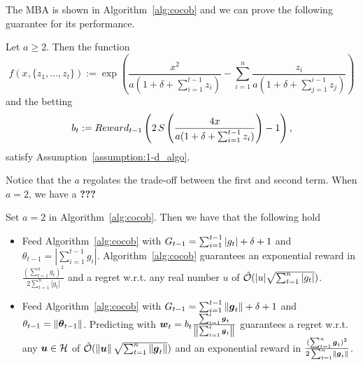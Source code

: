 The \ac{MBA} is shown in Algorithm~\ref{alg:cocob} and we can prove the following guarantee for its performance.
%
\begin{theorem}
\label{theo:cocob}
Let $a\geq2$. Then the function 
\[
f(x,\{z_1, \ldots, z_t\}) := \exp\left(\frac{x^2}{a (1+\delta+\sum_{i=1}^{t-1} z_i)} - \sum_{i=1}^{n} \frac{z_i}{a( 1+\delta+\sum_{j=1}^{i-1} z_j) } \right)
\]
and the betting 
\[
b_t:= Reward_{t-1} \left(2 \, S\left(\frac{4 x}{a (1+\delta+\sum_{i=1}^{t-1} z_i)}\right)-1\right),
\]
satisfy Assumption~\ref{assumption:1-d_algo}.
% 
\end{theorem}
%
Notice that the $a$ regolates the trade-off between the first and second term. When $a=2$, we have a \textbf{???}

\begin{cor}
Set $a=2$ in Algorithm~\ref{alg:cocob}. Then we have that the following hold

\begin{itemize}
\item Feed Algorithm~\ref{alg:cocob} with $G_{t-1}=\sum_{i=1}^{t-1} |g_t| + \delta + 1$ and $\theta_{t-1}=|\sum_{i=1}^{t-1} g_i|$.
Algorithm~\ref{alg:cocob} guarantees an exponential reward in $\frac{(\sum_{t=1}^n g_t)^2}{2 \sum_{t=1}^n |g_t|}$ and a regret w.r.t. any real number $u$ of $\tilde{\mathcal{O}}(|u| \sqrt{\sum_{t=1}^n |g_t|})$.

\item Feed Algorithm~\ref{alg:cocob} with $G_{t-1}=\sum_{i=1}^{t-1} \left\|{\boldsymbol{g}_t}\right\| + \delta + 1$ and $\theta_{t-1}=\left\|{{\boldsymbol{\theta}}_{t-1}}\right\|$.
Predicting with $\boldsymbol{w}_t=b_t \frac{\sum_{i=1}^t \boldsymbol{g}_t}{\left\|{\sum_{i=1}^t \boldsymbol{g}_t}\right\|}$ guarantees a regret w.r.t. any $\boldsymbol{u} \in \mathcal{H}$ of $\tilde{\mathcal{O}}(\left\|{\boldsymbol{u}}\right\| \sqrt{\sum_{t=1}^n \left\|{\boldsymbol{g}_t}\right\|})$ and an exponential reward in $\frac{(\sum_{t=1}^n \boldsymbol{g}_t)^2}{2 \sum_{t=1}^n \left\|{\boldsymbol{g}_t}\right\|}$.

\end{itemize}
\end{cor}